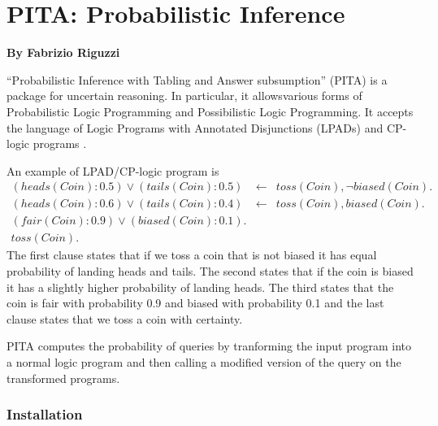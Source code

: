 \chapter{ PITA: Probabilistic  Inference}
\label{package:pita} 

  \begin{center}
    {\Large {\bf By Fabrizio Riguzzi}}
  \end{center}


%



``Probabilistic  Inference with Tabling and Answer subsumption'' (PITA) \cite{RigSwi10-ICLP10-IC} is a package for uncertain reasoning. In particular, it allowsvarious forms of Probabilistic Logic Programming and Possibilistic Logic Programming. It accepts the language of Logic Programs with Annotated Disjunctions (LPADs)\cite{VenVer03-TR,VenVer04-ICLP04-IC} and CP-logic programs \cite{VenDenBru-JELIA06,DBLP:journals/tplp/VennekensDB09}.

An example of LPAD/CP-logic program is 
\begin{eqnarray*}
(heads(Coin):0.5)\vee (tails(Coin):0.5)&\leftarrow&
toss(Coin),\neg biased(Coin).\\
(heads(Coin):0.6)\vee (tails(Coin):0.4)&\leftarrow&
toss(Coin), biased(Coin).\\
(fair(Coin):0.9) \vee (biased(Coin):0.1).&&\\
toss(Coin).&&
\end{eqnarray*}
The first clause states that if we toss a coin that is not biased it has equal probability of landing heads and tails. The second states that if the coin is biased it has a slightly higher probability of landing heads. The third states that the coin is fair with probability 0.9 and biased with probability 0.1 and the last clause states that we toss a coin with certainty.

PITA computes the probability of queries by tranforming the input program into a normal logic program and then calling a modified version of the query on the transformed programs.

\subsection{Installation}

